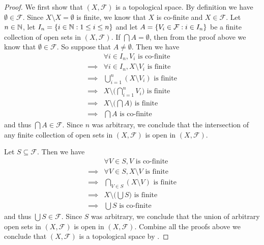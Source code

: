\begin{proof}
  We first show that \((X, \mathcal{F})\) is a topological space.
  By definition we have \(\emptyset \in \mathcal{F}\).
  Since \(X \setminus X = \emptyset\) is finite, we know that \(X\) is co-finite and \(X \in \mathcal{F}\).
  Let \(n \in \mathbb{N}\), let \(I_n = \left\lbrace i \in \mathbb{N} : 1 \leq i \leq n\right\rbrace\) and let \(A = \left\lbrace V_i \in \mathcal{F} : i \in I_n\right\rbrace\) be a finite collection of open sets in \((X, \mathcal{F})\).
  If \(\bigcap A = \emptyset\), then from the proof above we know that \(\emptyset \in \mathcal{F}\).
  So suppose that \(A \neq \emptyset\).
  Then we have
  \begin{align*}
             & \forall i \in I_n, V_i \text{ is co-finite}                     \\
    \implies & \forall i \in I_n, X \setminus V_i \text{ is finite}            \\
    \implies & \bigcup_{i = 1}^n (X \setminus V_i) \text{ is finite}           \\
    \implies & X \setminus \bigg(\bigcap_{i = 1}^n V_i\bigg) \text{ is finite} \\
    \implies & X \setminus \bigg(\bigcap A\bigg) \text{ is finite}             \\
    \implies & \bigcap A \text{ is co-finite}
  \end{align*}
  and thus \(\bigcap A \in \mathcal{F}\).
  Since \(n\) was arbitrary, we conclude that the intersection of any finite collection of open sets in \((X, \mathcal{F})\) is open in \((X, \mathcal{F})\).

  Let \(S \subseteq \mathcal{F}\).
  Then we have
  \begin{align*}
             & \forall V \in S, V \text{ is co-finite}             \\
    \implies & \forall V \in S, X \setminus V \text{ is finite}    \\
    \implies & \bigcap_{V \in S} (X \setminus V) \text{ is finite} \\
    \implies & X \setminus \bigg(\bigcup S\bigg) \text{ is finite} \\
    \implies & \bigcup S \text{ is co-finite}
  \end{align*}
  and thus \(\bigcup S \in \mathcal{F}\).
  Since \(S\) was arbitrary, we conclude that the union of arbitrary open sets in \((X, \mathcal{F})\) is open in \((X, \mathcal{F})\).
  Combine all the proofs above we conclude that \((X, \mathcal{F})\) is a topological space by .


\end{proof}
